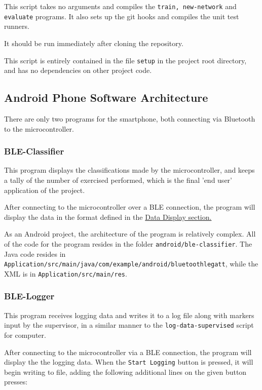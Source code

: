 \documentclass[a4paper]{article}
\begin{document}
This script takes no arguments and compiles the \lstinline{train, new-network} and \lstinline{evaluate} programs. It also sets up the git hooks and compiles the unit test runners.

It should be run immediately after cloning the repository.

This script is entirely contained in the file \lstinline{setup} in the project root directory, and has no dependencies on other project code.

\newpage
\subsection{Android Phone Software Architecture}%
\label{subsec:dc_asa}

There are only two programs for the smartphone, both connecting via Bluetooth to the microcontroller.

\subsubsection{BLE-Classifier}
\label{subsubsec:dc_asa_classifier}

This program displays the classifications made by the microcontroller, and keeps a tally of the number of exercised performed, which is the final 'end user' application of the project.

After connecting to the microcontroller over a BLE connection, the program will display the data in the format defined in the \hyperref[subsec:dc_datadisplay]{Data Display section.}

As an Android project, the architecture of the program is relatively complex. All of the code for the program resides in the folder \lstinline{android/ble-classifier}. The Java code resides in \lstinline{Application/src/main/java/com/example/android/bluetoothlegatt}, while the XML is in \lstinline{Application/src/main/res}.

\subsubsection{BLE-Logger}
\label{subsubsec:dc_asa_logger}

This program receives logging data and writes it to a log file along with markers input by the supervisor, in a similar manner to the \lstinline{log-data-supervised} script for computer.

After connecting to the microcontroller via a BLE connection, the program will display the the logging data. When the \lstinline{Start Logging} button is pressed, it will begin writing to file, adding the following additional lines on the given button presses:
\end{document}
